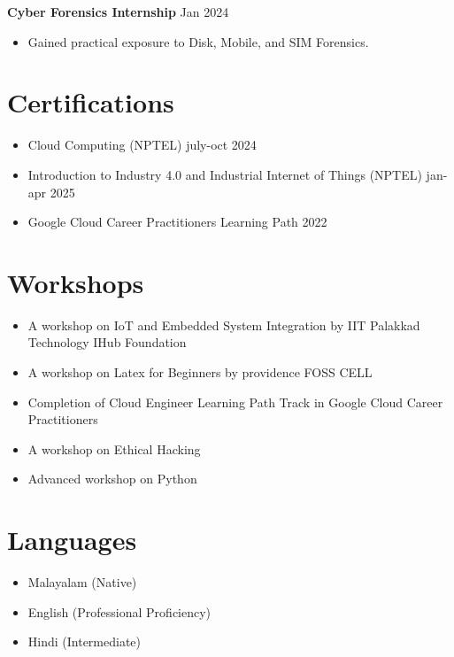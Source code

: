 \documentclass[a4paper,10pt]{article}
\begin{document}
\textbf{Cyber Forensics Internship} \hfill Jan 2024
\begin{itemize}
\item Gained practical exposure to Disk, Mobile, and SIM Forensics.
\end{itemize}

\section*{Certifications}
\begin{itemize}
\item Cloud Computing (NPTEL) \hfill july-oct 2024
\item Introduction to Industry 4.0 and Industrial Internet of Things (NPTEL) \hfill jan-apr 2025
\item Google Cloud Career Practitioners Learning Path \hfill 2022
\end{itemize}

\section*{Workshops}
\begin{itemize}
\item A workshop on IoT and Embedded System Integration
by IIT Palakkad Technology IHub Foundation
\item A workshop on Latex for Beginners by providence FOSS
CELL
\item Completion of Cloud Engineer Learning Path Track in
Google Cloud Career Practitioners
\item A workshop on Ethical Hacking
\item Advanced workshop on Python
\end{itemize}

\section*{Languages}
\begin{itemize}
\item Malayalam (Native)
\item English (Professional Proficiency)
\item Hindi (Intermediate)
\end{itemize}
\end{document}
